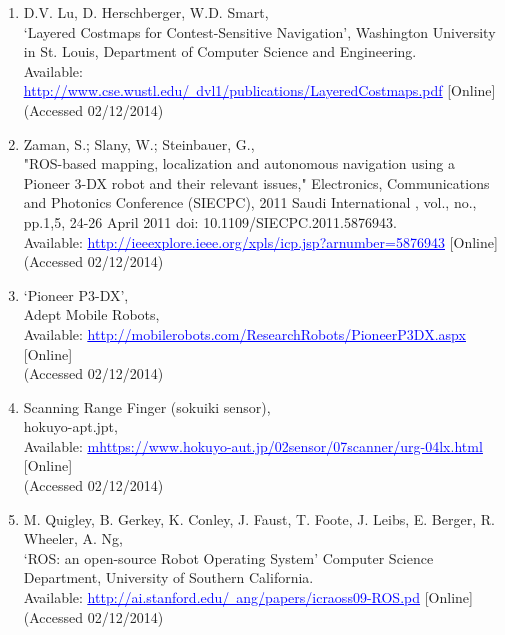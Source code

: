\documentclass{article}
\begin{document}
\begin{enumerate}
\item D.V. Lu, D. Herschberger, W.D. Smart,
\\‘Layered Costmaps for Contest-Sensitive Navigation’, Washington University in St. Louis, Department of Computer Science and Engineering.
\\Available: \href{http://www.cse.wustl.edu/~dvl1/publications/LayeredCostmaps.pdf}{\textcolor{blue}{\uline{http://www.cse.wustl.edu/~dvl1/publications/LayeredCostmaps.pdf}}} [Online]
\\(Accessed 02/12/2014)

\item Zaman, S.; Slany, W.; Steinbauer, G.,
\\"ROS-based mapping, localization and autonomous navigation using a Pioneer 3-DX robot and their relevant issues," Electronics, Communications and Photonics Conference (SIECPC), 2011 Saudi International , vol., no., pp.1,5, 24-26 April 2011 doi: 10.1109/SIECPC.2011.5876943. 
\\Available: \href{http://ieeexplore.ieee.org/xpls/icp.jsp?arnumber=5876943}{\textcolor{blue}{\uline{http://ieeexplore.ieee.org/xpls/icp.jsp?arnumber=5876943}}} [Online]
\\(Accessed 02/12/2014)

\item ‘Pioneer P3-DX’,
\\Adept Mobile Robots,
\\Available: \href{http://mobilerobots.com/ResearchRobots/PioneerP3DX.aspx}{\textcolor{blue}{\uline{http://mobilerobots.com/ResearchRobots/PioneerP3DX.aspx}}} [Online]
\\(Accessed 02/12/2014)

\item Scanning Range Finger (sokuiki sensor),
\\hokuyo-apt.jpt,
\\Available: \href{https://www.hokuyo-aut.jp/02sensor/07scanner/urg_04lx.html}{\textcolor{blue}{\uline{mhttps://www.hokuyo-aut.jp/02sensor/07scanner/urg-04lx.html}}} [Online]
\\(Accessed 02/12/2014)

\item M. Quigley, B. Gerkey, K. Conley, J. Faust, T. Foote, J. Leibs, E. Berger, R. Wheeler, A. Ng,
\\‘ROS: an open-source Robot Operating System’ Computer Science Department, University of Southern California. 
\\Available: \href{http://ai.stanford.edu/~ang/papers/icraoss09-ROS.pd}{\textcolor{blue}{\uline{http://ai.stanford.edu/~ang/papers/icraoss09-ROS.pd}}} [Online]
\\(Accessed 02/12/2014)


\end{enumerate}
\end{document}
